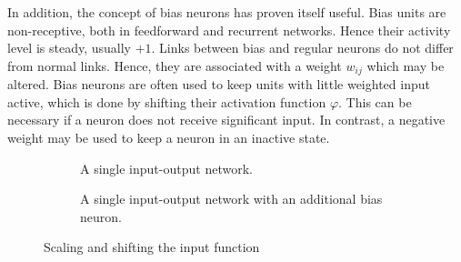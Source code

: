 \documentclass[10pt,a4paper,DIV=11]{scrreprt}
\begin{document}
In addition, the concept of bias neurons has proven itself useful. Bias units are non-receptive, both in feedforward and recurrent networks. 
Hence their activity level is steady, usually $+1$. Links between bias and regular neurons do not differ from normal links. Hence, they are 
associated with a weight $w_{ij}$ which may be altered. Bias neurons are often used to keep units with little weighted input active, 
which is done by shifting their activation function $\varphi$. This can be necessary if a neuron does not receive significant input. 
In contrast, a negative weight may be used to keep a neuron in an inactive state.
\begin{figure}[H]

\centering
\begin{subfigure}{.5\textwidth}
  \centering
  \caption{A single input-output network.}
  \label{fig:1on1}
\end{subfigure}%
\begin{subfigure}{.5\textwidth}
    \centering
    \caption{A single input-output network with an additional bias neuron.}
    \label{fig:2on1}
\end{subfigure}
\newline
\caption{Scaling and shifting the input function}
\label{fig:networks}
\end{figure}
\end{document}

